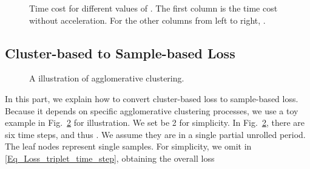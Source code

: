 \documentclass[10pt,twocolumn,letterpaper]{article}
\begin{document}
\begin{figure}[t]
   \begin{minipage}{1\linewidth}
   \center
   \end{minipage}       
   \caption{Time cost for different values of . The first column is the time cost without acceleration. For the other columns from left to right, .}
   \label{Fig_Approximation_EvalTime}
\end{figure}
\subsection{Cluster-based to Sample-based Loss}
\begin{figure}[!ht]
   \begin{minipage}{1.0\linewidth}
   \centering
   \end{minipage}
   \caption{A illustration of agglomerative clustering.}
   \label{Fig_AgglomerativeCLustering}
\end{figure}

In this part, we explain how to convert cluster-based loss to sample-based loss. Because it depends on specific agglomerative clustering processes, we use a toy example in Fig.~\ref{Fig_AgglomerativeCLustering} for illustration. We set  be 2 for simplicity. In Fig.~\ref{Fig_AgglomerativeCLustering}, there are six time steps, and thus . We assume they are in a single partial unrolled period. The leaf nodes represent single samples. For simplicity, we omit  in \eqref{Eq_Loss_triplet_time_step}, obtaining the overall loss
\end{document}
